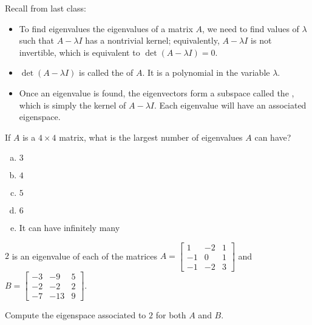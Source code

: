 
\begin{applicationActivities}{4}{28}
\begin{observation}
Recall from last class:
\begin{itemize}
\item To find eigenvalues the eigenvalues of a matrix $A$, we need to find values of $\lambda$ such that $A-\lambda I$ has a nontrivial kernel; equivalently, $A-\lambda I$ is not invertible, which is equivalent to $\det(A-\lambda I)=0$.  
\item $\det(A-\lambda I)$ is called the  of $A$.  It is a polynomial in the variable $\lambda$.
\item Once an eigenvalue is found, the eigenvectors form a subspace called the , which is simply the kernel of $A-\lambda I$.  Each eigenvalue will have an associated eigenspace.
\end{itemize}
\end{observation}

\begin{activity}{5}
  If $A$ is a $4 \times 4$ matrix, what is the largest number of eigenvalues $A$ can have?
  \begin{enumerate}[(a)]
  \item $3$
  \item $4$
  \item $5$
  \item $6$
  \item It can have infinitely many
  \end{enumerate}
\end{activity}

\begin{activity}{10}
  $2$ is an eigenvalue of each of the matrices $A=\begin{bmatrix} 1 & -2 & 1 \\ -1 & 0 & 1 \\ -1 & -2 & 3\end{bmatrix}$ and $B=\begin{bmatrix} -3 & -9 & 5 \\ -2 & -2 & 2 \\ -7 & -13 & 9 \end{bmatrix}$.

  Compute the eigenspace associated to $2$ for both $A$ and $B$.
\end{activity}


\end{applicationActivities}
